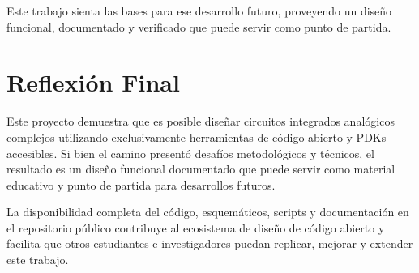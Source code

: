 \documentclass[12pt,a4paper]{report}
\begin{document}
Este trabajo sienta las bases para ese desarrollo futuro, proveyendo un diseño funcional, documentado y verificado que puede servir como punto de partida.

\section{Reflexión Final}

Este proyecto demuestra que es posible diseñar circuitos integrados analógicos complejos utilizando exclusivamente herramientas de código abierto y PDKs accesibles. Si bien el camino presentó desafíos metodológicos y técnicos, el resultado es un diseño funcional documentado que puede servir como material educativo y punto de partida para desarrollos futuros.

La disponibilidad completa del código, esquemáticos, scripts y documentación en el repositorio público contribuye al ecosistema de diseño de código abierto y facilita que otros estudiantes e investigadores puedan replicar, mejorar y extender este trabajo.
\end{document}
